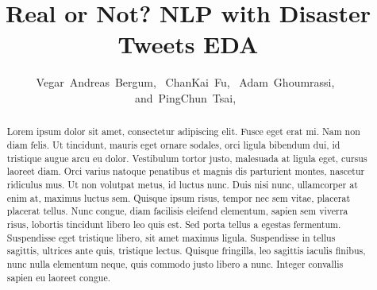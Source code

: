 \documentclass[journal, ]{IEEEtran}
\begin{document}
\title{Real or Not? NLP with Disaster Tweets EDA}

\author{Vegar~Andreas~Bergum,~
        ChanKai~Fu,~
        Adam~Ghoumrassi,~
        and~PingChun~Tsai,~%
 }

{}

\maketitle

\begin{abstract}
Lorem ipsum dolor sit amet, consectetur adipiscing elit. Fusce eget erat mi.
Nam non diam felis. Ut tincidunt, mauris eget ornare sodales, orci ligula
bibendum dui, id tristique augue arcu eu dolor. Vestibulum tortor justo,
malesuada at ligula eget, cursus laoreet diam. Orci varius natoque penatibus et
magnis dis parturient montes, nascetur ridiculus mus. Ut non volutpat metus, id
luctus nunc. Duis nisi nunc, ullamcorper at enim at, maximus luctus sem.
Quisque ipsum risus, tempor nec sem vitae, placerat placerat tellus. Nunc
congue, diam facilisis eleifend elementum, sapien sem viverra risus, lobortis
tincidunt libero leo quis est. Sed porta tellus a egestas fermentum.
Suspendisse eget tristique libero, sit amet maximus ligula. Suspendisse in
tellus sagittis, ultrices ante quis, tristique lectus. Quisque fringilla, leo
sagittis iaculis finibus, nunc nulla elementum neque, quis commodo justo libero
a nunc. Integer convallis sapien eu laoreet congue.
\end{abstract}%

\IEEEpeerreviewmaketitle

\end{document}
